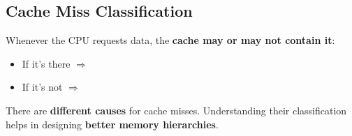 \subsection{Cache Miss Classification}

Whenever the CPU requests data, the \textbf{cache may or may not contain it}:
\begin{itemize}
    \item[\textcolor{Green3}{\faIcon{check}}] If it's there $\Rightarrow$ 
    \item[\textcolor{Red2}{\faIcon{times}}] If it's not $\Rightarrow$ 
\end{itemize}
There are \textbf{different causes} for cache misses. Understanding their classification helps in designing \textbf{better memory hierarchies}.

